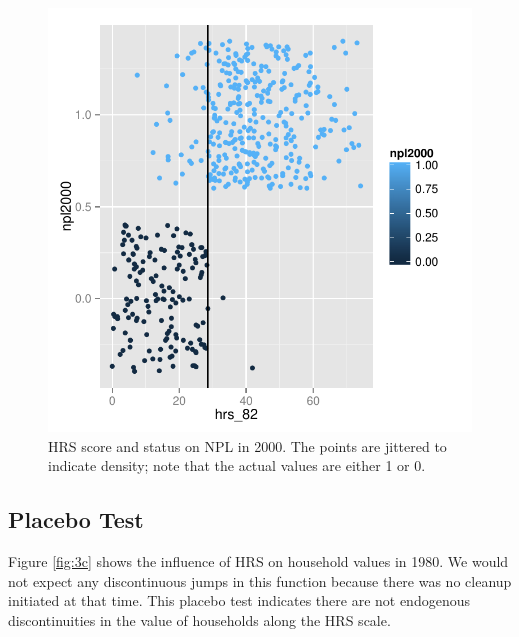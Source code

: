 \documentclass[letterpaper, 12pt]{article}
\begin{document}
\begin{figure}[htbp!]
\begin{center}
\includegraphics{fig-3b.pdf}
\caption{HRS score and status on NPL in 2000.  The points are jittered to indicate density; note that the actual values are either 1 or 0.}
\label{fig:3b}
\end{center}
\end{figure}

\subsection{Placebo Test}

Figure \ref{fig:3c} shows the influence of HRS on household values in 1980.  We would not expect any discontinuous jumps in this function because there was no cleanup initiated at that time.  This placebo test indicates there are not endogenous discontinuities in the value of households along the HRS scale.  
\end{document}

